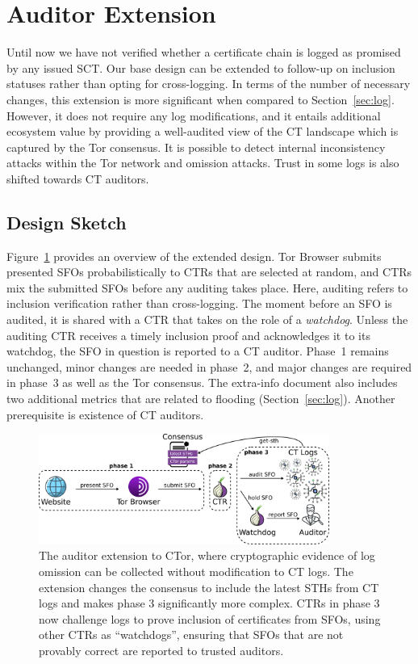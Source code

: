 \section{Auditor Extension} \label{sec:auditor}
Until now we have not verified whether a certificate chain is logged as promised
by any issued SCT.  Our base design can be extended to follow-up on inclusion
statuses rather than opting for cross-logging.  In terms of
the number of necessary changes, this extension is more significant when
compared to Section~\ref{sec:log}.  However, it does not require any log
modifications, and it entails additional ecosystem value by providing a
well-audited view of the CT landscape which is captured by the Tor consensus.
It is possible to detect internal inconsistency attacks within the Tor
network and omission attacks.  Trust in some logs is also shifted towards CT
auditors.

\subsection{Design Sketch} \label{sec:auditor:design}
Figure~\ref{fig:auditor} provides an overview of the extended design.  Tor
Browser submits presented SFOs probabilistically to CTRs that are selected at
random, and CTRs mix the submitted SFOs before any auditing takes place.  Here,
auditing refers to inclusion verification rather than cross-logging.  The moment
before an SFO is audited, it is shared with a CTR that takes on the role of a
\emph{watchdog}.  Unless the auditing CTR receives a timely inclusion proof and
acknowledges it to its watchdog, the SFO in question is reported to a CT
auditor.  Phase~1 remains unchanged, minor changes are needed in phase~2, and
major changes are required in phase~3 as well as the Tor consensus.  The
extra-info document also includes two additional metrics that are related to
flooding (Section~\ref{sec:log}).  Another prerequisite is existence of
CT auditors.

\begin{figure}
    \centering
    \includegraphics[width=0.85\textwidth]{img/design-auditor}
	\caption{The auditor extension to CTor, where cryptographic evidence of log
	omission can be collected without modification to CT logs. The extension
	changes the consensus to include the latest STHs from CT logs and makes
	phase 3 significantly more complex. CTRs in phase 3 now challenge logs to
	prove inclusion of certificates from SFOs, using other CTRs as
	``watchdogs'', ensuring that SFOs that are not provably correct are reported
	to trusted auditors.}
	\label{fig:auditor}
\end{figure}

